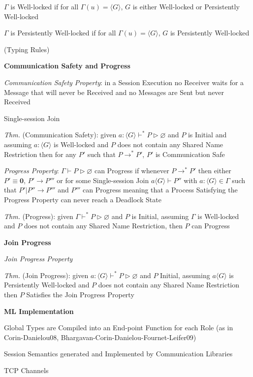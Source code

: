 $\Gamma$ is Well-locked if for all $\Gamma(u) = \langle{G}\rangle$,
$G$ is either Well-locked or Persistently Well-locked

$\Gamma$ is Persistently Well-locked if for all $\Gamma(u) =
\langle{G}\rangle$, $G$ is Persistently Well-locked

(Typing Rules) %


\textbf{Communication Safety and Progress}

\emph{Communication Safety Property}: in a Session Execution no
Receiver waits for a Message that will never be Received and no
Messages are Sent but never Received

Single-session Join

\emph{Thm.} (Communication Safety): given $a : \langle{G}\rangle
\vdash^* P \rhd \varnothing$ and $P$ is Initial and assuming $a :
\langle{G}\rangle$ is Well-locked and $P$ does not contain any Shared
Name Restriction then for any $P'$ such that $P \rightarrow^* P'$,
$P'$ is Communication Safe

\emph{Progress Property}: $\Gamma \vdash P \rhd \varnothing$ can
Progress if whenever $P \rightarrow^*P'$ then either $P' \equiv
\mathbf{0}$, $P' \rightarrow P'''$ or for some Single-session Join $a
\langle{G}\rangle \vdash P''$ with $a : \langle{G}\rangle \in \Gamma$
such that $P' | P'' \rightarrow P'''$ and $P'''$ can Progress meaning
that a Process Satisfying the Progress Property can never reach a
Deadlock State

\emph{Thm.} (Progress): given $\Gamma \vdash^* P \rhd \varnothing$ and
$P$ is Initial, assuming $\Gamma$ is Well-locked and $P$ does not
contain any Shared Name Restriction, then $P$ can Progress


\textbf{Join Progress}

\emph{Join Progress Property}

\emph{Thm.} (Join Progress): given $a : \langle{G}\rangle \vdash^* P
\rhd \varnothing$ and $P$ Initial, assuming $a \langle{G}\rangle$ is
Persistently Well-locked and $P$ does not contain any Shared Name
Restriction then $P$ Satisfies the Join Progress Property


\textbf{ML Implementation}

Global Types are Compiled into an End-point Function for each Role (as
in Corin-Danielou08, Bhargavan-Corin-Danielou-Fournet-Leifer09)

Session Semantics generated and Implemented by Communication Libraries

TCP Channels

